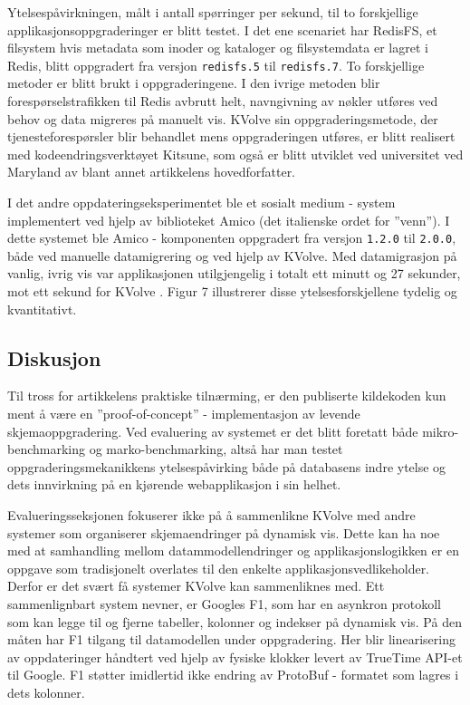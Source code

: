 Ytelsespåvirkningen, målt i antall spørringer per sekund, til to forskjellige applikasjonsoppgraderinger er blitt testet. I det ene scenariet har RedisFS, et filsystem hvis metadata som inoder og kataloger og filsystemdata er lagret i Redis, blitt oppgradert fra versjon \texttt{redisfs.5} til \texttt{redisfs.7}. To forskjellige metoder er blitt brukt i oppgraderingene. I den ivrige metoden blir forespørselstrafikken til Redis avbrutt helt, navngivning av nøkler utføres ved behov og data migreres på manuelt vis. KVolve sin oppgraderingsmetode, der tjenesteforespørsler blir behandlet mens oppgraderingen utføres, er blitt realisert med kodeendringsverktøyet Kitsune, som også er blitt utviklet ved universitet ved Maryland av blant annet artikkelens hovedforfatter.

I det andre oppdateringseksperimentet ble et sosialt medium - system implementert ved hjelp av biblioteket Amico (det italienske ordet for ''venn''). I dette systemet ble Amico - komponenten oppgradert fra versjon \texttt{1.2.0} til \texttt{2.0.0}, både ved manuelle datamigrering og ved hjelp av KVolve. Med datamigrasjon på vanlig, ivrig vis var applikasjonen utilgjengelig i totalt ett minutt og 27 sekunder, mot ett sekund for KVolve \citep{saur2016}. Figur 7 illustrerer disse ytelsesforskjellene tydelig og kvantitativt.

\subsection{Diskusjon}
Til tross for artikkelens praktiske tilnærming, er den publiserte kildekoden kun ment å være en ''proof-of-concept'' - implementasjon av levende skjemaoppgradering. Ved evaluering av systemet er det blitt foretatt både mikro-benchmarking og marko-benchmarking, altså har man testet oppgraderingsmekanikkens ytelsespåvirking både på databasens indre ytelse og dets innvirkning på en kjørende webapplikasjon i sin helhet.

Evalueringsseksjonen fokuserer ikke på å sammenlikne KVolve med andre systemer som organiserer skjemaendringer på dynamisk vis. Dette kan ha noe med at samhandling mellom datammodellendringer og applikasjonslogikken er en oppgave som tradisjonelt overlates til den enkelte applikasjonsvedlikeholder. Derfor er det svært få systemer KVolve kan sammenliknes med. Ett sammenlignbart system \cite{saur2016} nevner, er Googles F1, som har en asynkron protokoll som kan legge til og fjerne tabeller, kolonner og indekser på dynamisk vis. På den måten har F1 tilgang til datamodellen under oppgradering. Her blir linearisering av oppdateringer håndtert ved hjelp av fysiske klokker levert av TrueTime API-et til Google. F1 støtter imidlertid ikke endring av ProtoBuf - formatet som lagres i dets kolonner.

